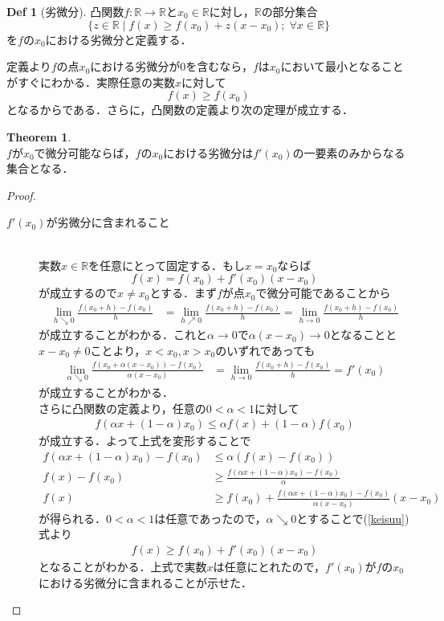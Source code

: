 \documentclass{jsarticle}
\theoremstyle{definition}
\theoremstyle{mystyle} %
\newtheorem*{Def}{Def}
\newtheorem*{theo}{Theorem}
\begin{document}
\begin{Def}[劣微分]
凸関数$f:\mathbb{R}\to\mathbb{R}$と$x_0\in\mathbb{R}$に対し，$\mathbb{R}$の部分集合
$$\{z\in \mathbb{R}\mid  f(x)\geq f(x_0)+z(x-x_0);\; \forall x\in\mathbb{R}\}$$
を$f$の$x_0$における劣微分と定義する．
\end{Def}
定義より$f$の点$x_0$における劣微分が$0$を含むなら，$f$は$x_0$において最小となることがすぐにわかる．実際任意の実数$x$に対して
$$f(x)\geq f(x_0)$$
となるからである．さらに，凸関数の定義より次の定理が成立する．
\begin{theo}\mbox{}\\
$f$が$x_0$で微分可能ならば，$f$の$x_0$における劣微分は$f'(x_0)$の一要素のみからなる集合となる．
\end{theo}
\begin{proof}
\begin{description}
\item[$f'(x_0)$が劣微分に含まれること]\mbox{}\\
実数$x\in\mathbb{R}$を任意にとって固定する．もし$x=x_0$ならば
$$f(x)=f(x_0)+f'(x_0)(x-x_0)$$
が成立するので$x\neq x_0$とする．まず$f$が点$x_0$で微分可能であることから
\begin{align*}
\lim_{h\searrow 0}\frac{f(x_0+h)-f(x_0)}{h}&=\lim_{h\nearrow 0}\frac{f(x_0+h)-f(x_0)}{h}=\lim_{h\to 0}\frac{f(x_0+h)-f(x_0)}{h}
\end{align*}
が成立することがわかる．これと$\alpha\to 0$で$\alpha(x-x_0)\to 0$となることと$x-x_0\neq 0$ことより，$x<x_0,x>x_0$のいずれであっても
\begin{equation}
\begin{split}
\label{keisuu}
\lim_{\alpha\searrow 0}\frac{f(x_0+\alpha(x-x_0))-f(x_0)}{\alpha(x-x_0)}&=\lim_{h\to 0}\frac{f(x_0+h)-f(x_0)}{h}=f'(x_0)
\end{split}
\end{equation}
が成立することがわかる．\\
さらに凸関数の定義より，任意の$0<\alpha<1$に対して
\begin{align*}
f(\alpha x+(1-\alpha)x_0)\leq \alpha f(x)+(1-\alpha)f(x_0)
\end{align*}
が成立する．よって上式を変形することで
\begin{align*}
f(\alpha x+(1-\alpha)x_0)-f(x_0)&\leq \alpha (f(x)-f(x_0))\\
f(x)-f(x_0)&\geq \frac{f(\alpha x+(1-\alpha)x_0)-f(x_0)}{\alpha}\\
f(x)&\geq f(x_0)+\frac{f(\alpha x+(1-\alpha)x_0)-f(x_0)}{\alpha(x-x_0)}(x-x_0)
\end{align*}
が得られる．$0<\alpha<1$は任意であったので，$\alpha\searrow 0$とすることで(\ref{keisuu})式より
\begin{align*}
f(x)\geq f(x_0)+f'(x_0)(x-x_0)
\end{align*}
となることがわかる．上式で実数$x$は任意にとれたので，$f'(x_0)$が$f$の$x_0$における劣微分に含まれることが示せた．\\


\end{description}
\end{proof}
\end{document}
